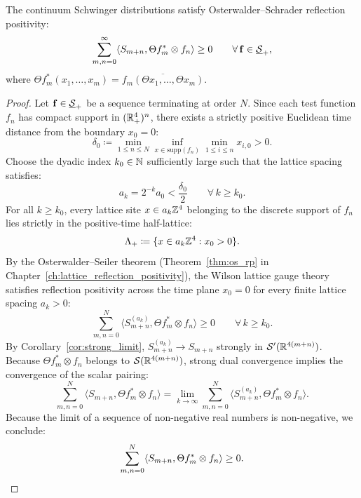 \begin{proposition}
\label{prop:os2}
The continuum Schwinger distributions satisfy Osterwalder--Schrader reflection positivity:
\begin{equation}
\label{eq:os2_continuum_claim}
\sum_{m, n = 0}^\infty \langle S_{m+n}, \Theta f_m^* \otimes f_n \rangle \ge 0 \qquad \forall \, \mathbf{f} \in \underline{\mathcal{S}}_+,
\end{equation}
where $\Theta f_m^*(x_1, \dots, x_m) = \overline{f_m(\Theta x_1, \dots, \Theta x_m)}$.
\end{proposition}

\begin{proof}
Let $\mathbf{f} \in \underline{\mathcal{S}}_+$ be a sequence terminating at order $N$. Since each test function $f_n$ has compact support in $(\mathbb{R}^4_+)^n$, there exists a strictly positive Euclidean time distance from the boundary $x_0 = 0$:
\begin{equation}
\label{eq:time_margin_delta0}
\delta_0 \coloneqq \min_{1 \le n \le N} \inf_{x \in \mathrm{supp}(f_n)} \min_{1 \le i \le n} x_{i, 0} > 0.
\end{equation}
Choose the dyadic index $k_0 \in \mathbb{N}$ sufficiently large such that the lattice spacing satisfies:
\begin{equation}
a_k = 2^{-k} a_0 < \frac{\delta_0}{2} \qquad \forall \, k \ge k_0.
\end{equation}
For all $k \ge k_0$, every lattice site $x \in a_k \mathbb{Z}^4$ belonging to the discrete support of $f_n$ lies strictly in the positive-time half-lattice:
\begin{equation}
\Lambda_+ \coloneqq \{x \in a_k \mathbb{Z}^4 : x_0 > 0\}.
\end{equation}
By the Osterwalder--Seiler theorem (Theorem~\ref{thm:os_rp} in Chapter~\ref{ch:lattice_reflection_positivity}), the Wilson lattice gauge theory satisfies reflection positivity across the time plane $x_0 = 0$ for every finite lattice spacing $a_k > 0$:
\begin{equation}
\label{eq:lattice_rp_finite_k}
\sum_{m, n = 0}^N \langle S_{m+n}^{(a_k)}, \Theta f_m^* \otimes f_n \rangle \ge 0 \qquad \forall \, k \ge k_0.
\end{equation}
By Corollary~\ref{cor:strong_limit}, $S_{m+n}^{(a_k)} \to S_{m+n}$ strongly in $\mathcal{S}'(\mathbb{R}^{4(m+n)})$. Because $\Theta f_m^* \otimes f_n$ belongs to $\mathcal{S}(\mathbb{R}^{4(m+n)})$, strong dual convergence implies the convergence of the scalar pairing:
\begin{equation}
\sum_{m, n = 0}^N \langle S_{m+n}, \Theta f_m^* \otimes f_n \rangle = \lim_{k \to \infty} \sum_{m, n = 0}^N \langle S_{m+n}^{(a_k)}, \Theta f_m^* \otimes f_n \rangle.
\end{equation}
Because the limit of a sequence of non-negative real numbers is non-negative, we conclude:
\begin{equation}
\sum_{m, n = 0}^N \langle S_{m+n}, \Theta f_m^* \otimes f_n \rangle \ge 0. \qedhere
\end{equation}
\end{proof}


